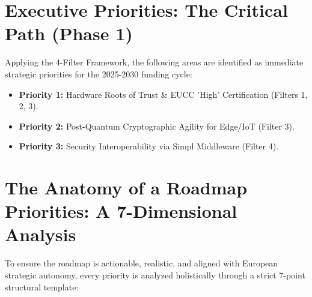 \documentclass[12pt,a4paper]{report}
\begin{document}
\section*{Executive Priorities: The Critical Path (Phase 1)}
Applying the 4-Filter Framework, the following areas are identified as immediate strategic priorities for the 2025-2030 funding cycle:
\begin{itemize}
    \item \textbf{Priority 1:} Hardware Roots of Trust \& EUCC 'High' Certification (Filters 1, 2, 3).
    \item \textbf{Priority 2:} Post-Quantum Cryptographic Agility for Edge/IoT (Filter 3).
    \item \textbf{Priority 3:} Security Interoperability via Simpl Middleware (Filter 4).
\end{itemize}

\section{The Anatomy of a Roadmap Priorities: A 7-Dimensional Analysis}
To ensure the roadmap is actionable, realistic, and aligned with European strategic autonomy, every priority is analyzed holistically through a strict 7-point structural template:
\end{document}
